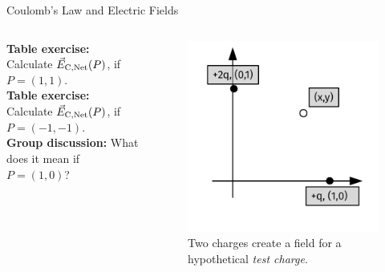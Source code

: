 \documentclass{beamer}
\begin{document}
\begin{frame}{Coulomb’s Law and Electric Fields}
\small
\begin{columns}[T]
\begin{column}{0.5\textwidth}
\textbf{Table exercise:} Calculate $\vec{E}_{\rm C,Net}(P)$, if $P = (1,1)$. \\ \vspace{0.5cm}
\textbf{Table exercise:} Calculate $\vec{E}_{\rm C,Net}(P)$, if $P = (-1,-1)$. \\ \vspace{0.5cm}
\textbf{Group discussion:} What does it mean if $P = (1,0)$? \\ \vspace{0.5cm}
\end{column}
\begin{column}{0.5\textwidth}
\begin{figure}
\includegraphics[width=\textwidth]{figures/NetField4.pdf}
\caption{\label{fig:netfield4} Two charges create a field for a hypothetical \textit{test charge}.}
\end{figure}
\end{column}
\end{columns}
\end{frame}
\end{document}
